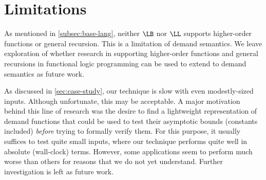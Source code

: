 \section{Limitations}\label{sec:limitations}

As mentioned in \cref{subsec:base-lang}, neither \(\LB\) nor \(\LL\)
supports higher-order functions or general recursion. This is a limitation of
demand semantics. We leave exploration of whether research in supporting higher-order
functions and general recursions in functional logic programming can be used to
extend to demand semantics as future work.

As discussed in \cref{sec:case-study}, our technique is slow with even
modestly-sized inputs. Although unfortunate, this may be acceptable. A major
motivation behind this line of research was the desire to find a lightweight
representation of demand functions that could be used to test their asymptotic
bounds (constants included) \emph{before} trying to formally verify them. For
this purpose, it usually suffices to test quite small inputs, where our
technique performs quite well in absolute (wall-clock) terms. However, some
applications seem to perform much worse than others for reasons that we do not
yet understand. Further investigation is left as future work.
